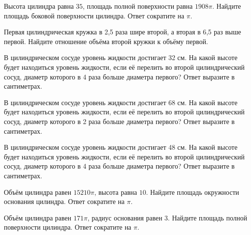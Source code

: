 \documentclass[4apaper]{article}
\begin{document}
\begin{taskBN}{22}
Высота цилиндра равна $35$, площадь полной поверхности равна $1908\pi$. Найдите площадь боковой поверхности цилиндра. Ответ сократите на $\pi$.
\end{taskBN}

\begin{taskBN}{23}
 Первая цилиндрическая кружка в 2,5 раза шире второй, а вторая в 6,5 раз выше первой. Найдите отношение объёма второй кружки к объёму первой.
\end{taskBN}

\begin{taskBN}{24}
В цилиндрическом сосуде уровень жидкости достигает 32 см. На какой высоте будет находиться уровень жидкости, если её перелить во второй цилиндрический сосуд, диаметр которого в 4 раза больше диаметра первого? Ответ выразите в сантиметрах.
\end{taskBN}

\begin{taskBN}{25}
В цилиндрическом сосуде уровень жидкости достигает 68 см. На какой высоте будет находиться уровень жидкости, если её перелить во второй цилиндрический сосуд, диаметр которого в 2 раза больше диаметра первого? Ответ выразите в сантиметрах.
\end{taskBN}

\begin{taskBN}{26}
В цилиндрическом сосуде уровень жидкости достигает 48 см. На какой высоте будет находиться уровень жидкости, если её перелить во второй цилиндрический сосуд, диаметр которого в 4 раза больше диаметра первого? Ответ выразите в сантиметрах.
\end{taskBN}

\begin{taskBN}{27}
Объём цилиндра равен $15210\pi$, высота равна $10$. Найдите площадь окружности основания цилиндра. Ответ сократите на $\pi$.
\end{taskBN}

\begin{taskBN}{28}
Объём цилиндра равен $171\pi$, радиус основания равен $3$. Найдите площадь полной поверхности цилиндра. Ответ сократите на $\pi$.
\end{taskBN}
\end{document}
